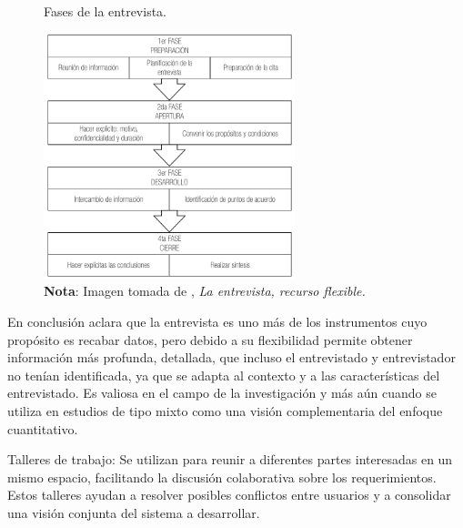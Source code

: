 		\vspace{0.3cm} %
		
		\begin{figure}[h] %
			\caption[Fases de la entrevista]
			{\newline Fases de la entrevista.} %
			\vspace{0.3cm}
			\centering
			\includegraphics[width=0.65\textwidth]{imagenes/figura2_2.png} %
			\vspace{0.3cm}
			\caption*{\textup{\textbf{Nota}: Imagen tomada de \textcite{diaz2013entrevista}, \textit{La entrevista, recurso flexible.}}}
			\vspace{-0.8cm}
			\label{fig:figura2_2} %
		\end{figure}
		
		En conclusión \textcite{diaz2013entrevista} aclara que la entrevista es uno más de los instrumentos cuyo propósito es recabar datos, pero debido a su flexibilidad permite obtener información más profunda, detallada, que incluso el entrevistado y entrevistador no tenían identificada, ya que se adapta al contexto y a las características del entrevistado. Es valiosa en el campo de la investigación y más aún cuando se utiliza en estudios de tipo mixto como una visión complementaria del enfoque cuantitativo.
						
		Talleres de trabajo: Se utilizan para reunir a diferentes partes interesadas en un mismo espacio, facilitando la discusión colaborativa sobre los requerimientos. Estos talleres ayudan a resolver posibles conflictos entre usuarios y a consolidar una visión conjunta del sistema a desarrollar.
		

